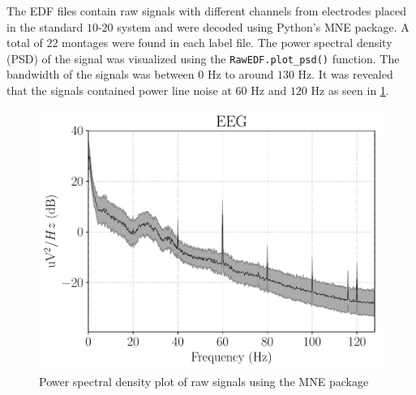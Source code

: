 

The EDF files contain raw signals with different channels from electrodes placed in the standard $10$-$20$ system and were decoded using Python's MNE package. A total of $22$ montages were found in each label file. The power spectral density (PSD) of the signal was visualized using the \verb+RawEDF.plot_psd()+ function. The bandwidth of the signals was between $0$ Hz to around $130$ Hz. It was revealed that the signals contained power line noise at $60$ Hz and $120$ Hz as seen in \cref{fig:psd}. 

\begin{figure}[!ht]
	\centering
	\includegraphics[width=0.7\linewidth]{pictures/psd.pdf}
	\caption[Power Spectral Density Plot of Raw Signals]{Power spectral density plot of raw signals using the MNE package}\label{fig:psd}  
\end{figure}

